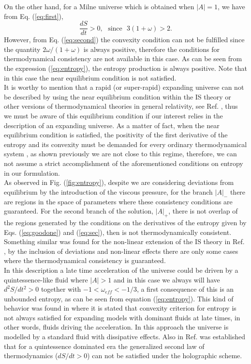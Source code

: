 \documentclass[twocolumn,showpacs,nofootinbib,floats,amsmath,amssymb]{revtex4}
\begin{document}
On the other hand, for a Milne universe which is obtained when $\left|A\right| = 1$, we have from Eq. (\ref{eq:first}),
\begin{equation}
\frac{dS}{dt} > 0, \ \ \ \mbox{since} \ \ \ 3(1+\omega) > 2.
\end{equation}   
However, from Eq. (\ref{eq:second}) the convexity condition can not be fulfilled since the quantity $2\omega /(1+\omega)$ is always positive, therefore the conditions for thermodynamical consistency are not available in this case. As can be seen from the expression (\ref{eq:entropy}), the entropy production is always positive. Note that in this case the near equilibrium condition is not satisfied.\\ 

It is worthy to mention that a rapid (or super-rapid) expanding universe can not be described by using the near equilibrium condition within the IS theory or other versions of thermodynamical theories in general relativity, see Ref. \cite{maartens}, thus we must be aware of this equilibrium condition if our interest relies in the description of an expanding universe. As a matter of fact, when the near equilibrium condition is satisfied, the positivity of the first derivative of the entropy and its convexity must be demanded for every ordinary thermodynamical system \cite{callen}, as shown previously we are not close to this regime, therefore, we can not assume a strict accomplishment of the aforementioned conditions on entropy in our formulation.\\ 

As observed in Fig. (\ref{fig:entropy}), despite we are considering deviations from equilibrium by the introduction of the viscous pressure, for the branch $\left|A\right|_{-}$ there are regions in the space of parameters where these consistency conditions are guaranteed. For the second branch of the solution, $\left|A\right|_{+}$, there is not overlap of the regions generated by the conditions on the derivatives of the entropy given by Eqs. (\ref{eq:goodone}) and (\ref{eq:sec}), then is not thermodynamically consistent. Something similar was found for the non-linear extension of the IS theory in Ref. \cite{CCL}, by the inclusion of deviations and non-linear effects there are only some cases where the thermodynamical consistency is guaranteed.\\ 

In this description a late time acceleration of the universe could be driven by a quintessence-like fluid where $\left|A\right| > 1$ and in this case we always will have $d^{2}S/dt^{2} > 0$ together with $-1 < \omega_{eff} < -1/3$, a first consequence of this is an unbounded entropy, as can be seen from equation (\ref{eq:entropy}). This kind of behavior was found in \cite{termoPavon} where it is stated that convexity criterion for entropy is not always satisfied for expanding models with dominant fluids at late times, in other words, fluids driving the acceleration. In this approach the universe is modelled by a standard fluid with dissipative effects. Also in Ref. \cite{holo} was established that for a quintessence dominated era the generalized second law of thermodynamics ($dS/dt > 0$) can not be satisfied under the holographic scheme.\\ 
\end{document}
